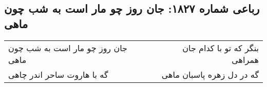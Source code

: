 \begin{center}
\section*{رباعی شماره ۱۸۲۷: جان روز چو مار است به شب چون ماهی}
\label{sec:1827}
\begin{longtable}{l p{0.5cm} r}
جان روز چو مار است به شب چون ماهی
&&
بنگر که تو با کدام جان همراهی
\\
گه با هاروت ساحر اندر چاهی
&&
گه در دل زهره پاسبان ماهی
\\
\end{longtable}
\end{center}
